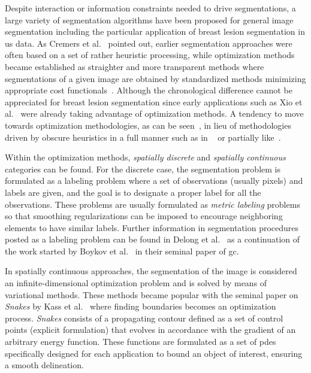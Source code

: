 \documentclass[authoryear,preprint,review,12pt]{elsarticle}
\begin{document}


Despite interaction or information constraints needed to drive segmentations, a large variety of segmentation algorithms have been proposed for general image segmentation including the particular application of breast lesion segmentation in \ac{us} data. As Cremers et al.~\cite{cremers2007review} pointed out, earlier segmentation approaches were often based on a set of rather heuristic processing, while optimization methods became established as straighter and more transparent methods where segmentations of a given image are obtained by standardized methods minimizing appropriate cost functionals~\cite{cremers2007review}. Although the chronological difference cannot be appreciated for breast lesion segmentation since early applications such as Xio et al.~\cite{Xiao:2002p5639} were already taking advantage of optimization methods. A tendency to move towards optimization methodologies, as can be seen~\cite{Jiang:2012p14354}, in lieu of methodologies driven by  obscure heuristics in a full manner such as in ~\cite{Drukker:2002p10442,Horsch:2001p6028,massich2010lesion} or partially like~\cite{Madabhushi:2003p6036}. 

Within the optimization methods, \emph{spatially discrete} and \emph{spatially continuous} categories can be found. 
For the discrete case, the segmentation problem is formulated as a labeling problem where a set of observations (usually pixels) and labels are given, and the goal is to designate a proper label for all the observations. These problems are usually formulated as \emph{metric labeling} problems~\cite{boykov2001fast} so that smoothing regularizations can be imposed to encourage neighboring elements to have similar labels. Further information in segmentation procedures posted as a labeling problem can be found in Delong et al.~\cite{delong2012fast} as a continuation of the work started by Boykov et al.~\cite{boykov2001fast}
in their seminal paper of \acf{gc}.

In spatially continuous approaches, the segmentation of the image is considered an infinite-dimensional optimization problem and is solved by means of variational methods. These methods became popular with the seminal paper on \emph{Snakes} by Kass et al.~\cite{kass1988snakes} where finding boundaries becomes an optimization process. \emph{Snakes} consists of a propagating contour defined as a set of control points (explicit formulation)  that evolves in accordance with the gradient of an arbitrary energy function. These functions are formulated as a set of \acp{pde} specifically designed for each application to bound an object of interest, ensuring a smooth delineation.
\end{document}
